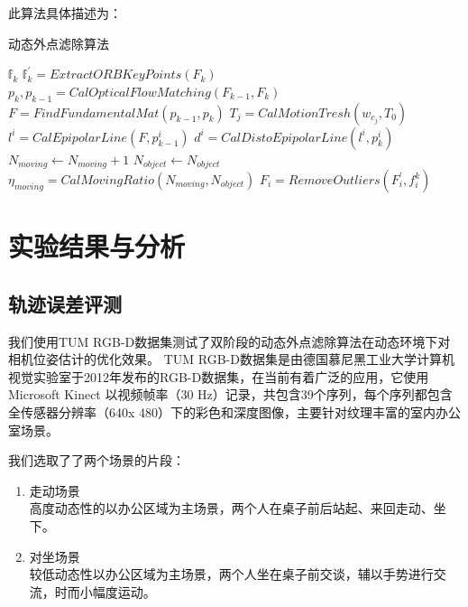 此算法具体描述为：
\begin{algorithm} %
    \small
    \caption{动态外点滤除算法} \label{alg1} %
    \begin{algorithmic}[1] %
    $\mathbb{f}_{k}$
    \State ${\mathbb{f}}_{k}^{'}=ExtractORBKeyPoints(F_{k})$
    \State $p_{k},p_{k-1}=CalOpticalFlowM atching(F_{k-1},F_{k})$
    \State $F=FindFundamentalMat(p_{k-1},p_{k})$
    \State $T_{j}=CalMotionT resh(w_{c_{j}},T_{0})$
    \State $l^{i}=CalEpipolarLine(F,p_{k-1}^{i})$
    \State $d^{i}=CalDistoEpipolarLine(l^{i},p_{k}^{i})$
    \State $N_{moving}\gets N_{moving}+1$
    \EndIf
    \State $N_{object}\gets N_{object}$
    \EndIf
    \EndFor
    \State $\eta_{moving}=CalMovingRatio(N_{moving},N_{object})$
    \State $F_{i}=RemoveOutliers(F_{i}^{'},f_{i}^{k})$
    \EndIf
    \EndFor
    \EndIf
    \EndFor
    \EndProcedure
    \end{algorithmic} 
\end{algorithm}


\section{实验结果与分析}
\subsection{轨迹误差评测}
我们使用TUM RGB-D数据集\citep{sturm2012benchmark}测试了双阶段的动态外点滤除算法在动态环境下对相机位姿估计的优化效果。
TUM RGB-D数据集是由德国慕尼黑工业大学计算机视觉实验室于2012年发布的RGB-D数据集，在当前有着广泛的应用，它使用Microsoft Kinect
以视频帧率（30 Hz）记录，共包含39个序列，每个序列都包含全传感器分辨率（640x 480）下的彩色和深度图像，主要针对纹理丰富的室内办公室场景。

我们选取了了两个场景的片段：
{
\setlist[enumerate]{}%
\begin{enumerate}[nosep]
    \item 走动场景\\高度动态性的以办公区域为主场景，两个人在桌子前后站起、来回走动、坐下。
    \item 对坐场景\\较低动态性以办公区域为主场景，两个人坐在桌子前交谈，辅以手势进行交流，时而小幅度运动。
\end{enumerate}
}

